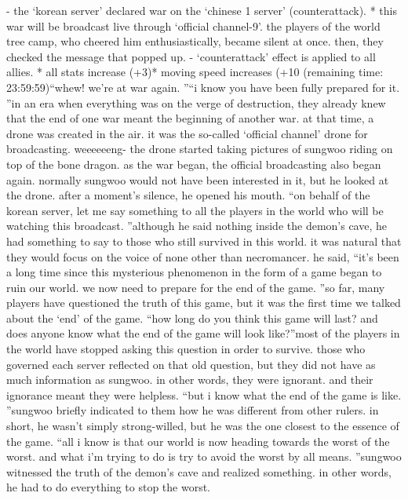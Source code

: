 - the ‘korean server’ declared war on the ‘chinese 1 server’ (counterattack).
* this war will be broadcast live through ‘official channel-9’.
the players of the world tree camp, who cheered him enthusiastically, became silent at once.
 then, they checked the message that popped up.
- ‘counterattack’ effect is applied to all allies.
* all stats increase (+3)* moving speed increases (+10%
 (remaining time: 23:59:59)“whew! we’re at war again.
”“i know you have been fully prepared for it.
”in an era when everything was on the verge of destruction, they already knew that the end of one war meant the beginning of another war.
at that time, a drone was created in the air.
 it was the so-called ‘official channel’ drone for broadcasting.
weeeeeeng-
the drone started taking pictures of sungwoo riding on top of the bone dragon.
 as the war began, the official broadcasting also began again.
normally sungwoo would not have been interested in it, but he looked at the drone.
after a moment’s silence, he opened his mouth.
“on behalf of the korean server, let me say something to all the players in the world who will be watching this broadcast.
”although he said nothing inside the demon’s cave, he had something to say to those who still survived in this world.
 it was natural that they would focus on the voice of none other than necromancer.
he said, “it’s been a long time since this mysterious phenomenon in the form of a game began to ruin our world.
 we now need to prepare for the end of the game.
”so far, many players have questioned the truth of this game, but it was the first time we talked about the ‘end’ of the game.
“how long do you think this game will last? and does anyone know what the end of the game will look like?”most of the players in the world have stopped asking this question in order to survive.
 those who governed each server reflected on that old question, but they did not have as much information as sungwoo.
 in other words, they were ignorant.
 and their ignorance meant they were helpless.
“but i know what the end of the game is like.
”sungwoo briefly indicated to them how he was different from other rulers.
 in short, he wasn’t simply strong-willed, but he was the one closest to the essence of the game.
“all i know is that our world is now heading towards the worst of the worst.
 and what i’m trying to do is try to avoid the worst by all means.
”sungwoo witnessed the truth of the demon’s cave and realized something.
 in other words, he had to do everything to stop the worst.
